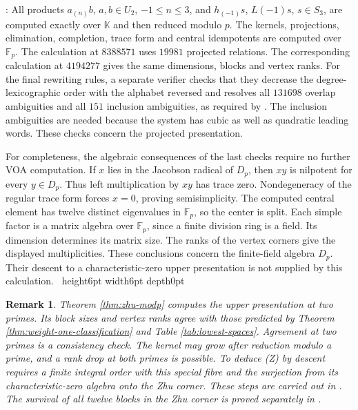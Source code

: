 \documentclass[leqno]{article}
\newcommand{\K}{\ensuremath{\mathbb{K}}}
\renewcommand{\leq}{\ensuremath{\leqslant}}
\newcommand{\qed}{\hfill \vrule height6pt  width6pt depth0pt}
\newtheorem{remark}[thm]{Remark}
\newenvironment{proof}[1][]{\noindent {\it Proof #1} : }{\hbox{~}\qed
\smallskip
}
\numberwithin{equation}{section}
\begin{document}
\begin{proof}
All products $a_{(n)}b$, $a,b \in U_2$, $-1 \leq n \leq 3$, and $h_{(-1)}s$, $L(-1)s$, $s \in S_3$, are computed exactly over $\K$ and then reduced modulo $p$. The kernels, projections, elimination, completion, trace form and central idempotents are computed over $\mathbb F_p$. The calculation at $8388571$ uses $19981$ projected relations. The corresponding calculation at $4194277$ gives the same dimensions, blocks and vertex ranks. For the final rewriting rules, a separate verifier checks that they decrease the degree-lexicographic order with the alphabet reversed and resolves all $131698$ overlap ambiguities and all $151$ inclusion ambiguities, as required by \cite[Theorem 1.2]{Ber78}. The inclusion ambiguities are needed because the system has cubic as well as quadratic leading words. These checks concern the projected presentation.

For completeness, the algebraic consequences of the last checks require no further VOA computation. If $x$ lies in the Jacobson radical of $D_p$, then $xy$ is nilpotent for every $y \in D_p$. Thus left multiplication by $xy$ has trace zero. Nondegeneracy of the regular trace form forces $x = 0$, proving semisimplicity. The computed central element has twelve distinct eigenvalues in $\mathbb F_p$, so the center is split. Each simple factor is a matrix algebra over $\mathbb F_p$, since a finite division ring is a field. Its dimension determines its matrix size. The ranks of the vertex corners give the displayed multiplicities. These conclusions concern the finite-field algebra $D_p$. Their descent to a characteristic-zero upper presentation is not supplied by this calculation.
\end{proof}

\begin{remark}\normalfont
\label{rem:zhu-status}
Theorem \ref{thm:zhu-modp} computes the upper presentation at two primes. Its block sizes and vertex ranks agree with those predicted by Theorem \ref{thm:weight-one-classification} and Table \ref{tab:lowest-spaces}. Agreement at two primes is a consistency check. The kernel may grow after reduction modulo a prime, and a rank drop at both primes is possible. To deduce (Z) by descent requires a finite integral order with this special fibre and the surjection from its characteristic-zero algebra onto the Zhu corner. These steps are carried out in \cite[Theorems A.10 and A.13]{ArhIII}. The survival of all twelve blocks in the Zhu corner is proved separately in \cite[Theorem A.20]{ArhIII}.
\end{remark}
\end{document}

